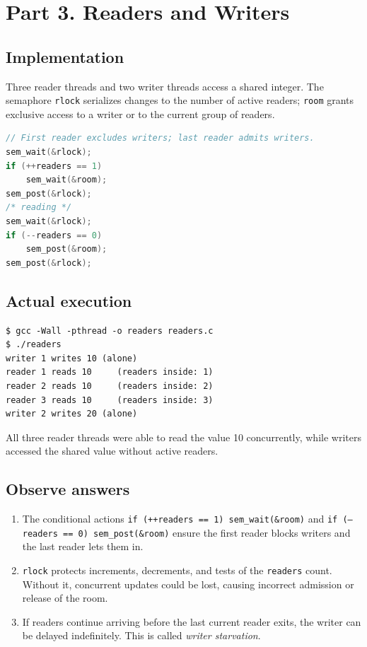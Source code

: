 \documentclass[12pt,a4paper]{article}
\begin{document}
\section{Part 3. Readers and Writers}
\subsection{Implementation}
Three reader threads and two writer threads access a shared integer. The semaphore \texttt{rlock} serializes changes to the number of active readers; \texttt{room} grants exclusive access to a writer or to the current group of readers.
\begin{lstlisting}[language=C]
// First reader excludes writers; last reader admits writers.
sem_wait(&rlock);
if (++readers == 1)
    sem_wait(&room);
sem_post(&rlock);
/* reading */
sem_wait(&rlock);
if (--readers == 0)
    sem_post(&room);
sem_post(&rlock);
\end{lstlisting}
\subsection{Actual execution}
\begin{lstlisting}
$ gcc -Wall -pthread -o readers readers.c
$ ./readers
writer 1 writes 10 (alone)
reader 1 reads 10     (readers inside: 1)
reader 2 reads 10     (readers inside: 2)
reader 3 reads 10     (readers inside: 3)
writer 2 writes 20 (alone)
\end{lstlisting}
All three reader threads were able to read the value 10 concurrently, while writers accessed the shared value without active readers.
\subsection{Observe answers}
\begin{enumerate}[label=\arabic*.]
\item The conditional actions \texttt{if (++readers == 1) sem\_wait(\&room)} and \texttt{if (--readers == 0) sem\_post(\&room)} ensure the first reader blocks writers and the last reader lets them in.
\item \texttt{rlock} protects increments, decrements, and tests of the \texttt{readers} count. Without it, concurrent updates could be lost, causing incorrect admission or release of the room.
\item If readers continue arriving before the last current reader exits, the writer can be delayed indefinitely. This is called \emph{writer starvation}.
\end{enumerate}
\end{document}
